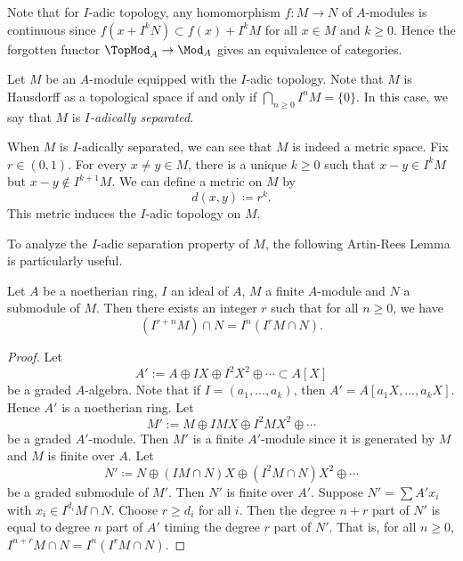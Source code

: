     Note that for \(I\)-adic topology, any homomorphism \(f: M \to N\) of \(A\)-modules is continuous since \( f(x + I^kN) \subset f(x) + I^kM \) for all \(x \in M\) and \(k \geq 0\).
    Hence the forgotten functor \(\TopMod_A \to \Mod_A\) gives an equivalence of categories.

    Let \(M\) be an \(A\)-module equipped with the \(I\)-adic topology.
    Note that \(M\) is Hausdorff as a topological space if and only if \(\bigcap_{n \geq 0} I^nM = \{0\}\).
    In this case, we say that \(M\) is \emph{\(I\)-adically separated}.
    
    When \(M\) is \(I\)-adically separated, we can see that \(M\) is indeed a metric space.
    Fix \(r \in (0,1)\). 
    For every \(x\neq y \in M\), there is a unique \(k \geq 0\) such that \(x - y \in I^kM\) but \(x - y \notin I^{k+1}M\).
    We can define a metric on \(M\) by
    \[ d(x, y) \coloneqq r^k. \]
    This metric induces the \(I\)-adic topology on \(M\).
    
    To analyze the \(I\)-adic separation property of \(M\), the following Artin-Rees Lemma is particularly useful.

    \begin{theorem}\label{thm: Artin Rees Lemma}
        Let \(A\) be a noetherian ring, \(I\) an ideal of \(A\), \(M\) a finite \(A\)-module and \(N\) a submodule of \(M\). 
        Then there exists an integer \(r\) such that for all \(n \geq 0\), we have
        \[ (I^{r+n}M) \cap N = I^n (I^r M \cap N). \]
    \end{theorem}
    \begin{proof}
        Let
        \[ A' := A \oplus I X \oplus I^2 X^2 \oplus \cdots \subset A[X]\] 
        be a graded \(A\)-algebra.
        Note that if \(I = (a_1,\ldots,a_k)\), then \(A' = A[a_1X,\ldots,a_kX]\).
        Hence \(A'\) is a noetherian ring.
        Let 
        \[ M' := M \oplus I M X \oplus I^2 M X^2 \oplus \cdots\]
        be a graded \(A'\)-module.
        Then \(M'\) is a finite \(A'\)-module since it is generated by \(M\) and \(M\) is finite over \(A\).
        Let 
        \[ N' \coloneqq N \oplus (IM \cap N) X \oplus (I^2 M \cap N) X^2 \oplus \cdots\]
        be a graded submodule of \(M'\).
        Then \(N'\) is finite over \(A'\).
        Suppose \(N' = \sum A'x_i\) with \(x_i \in I^{d_i}M \cap N\).
        Choose \(r \geq d_i\) for all \(i\).
        Then the degree \(n+r\) part of \(N'\) is equal to degree \(n\) part of \(A'\) timing the degree \(r\) part of \(N'\).
        That is, for all \(n \geq 0\), \(I^{n+r}M \cap N = I^n (I^r M \cap N)\).
    \end{proof}

